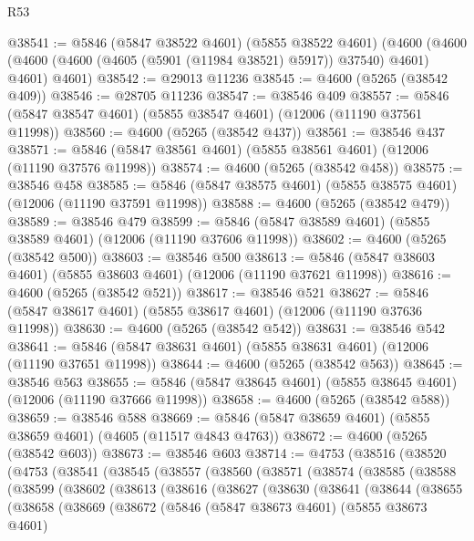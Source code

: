 \begin{lexlean}{R53}
\begin{coremodule}
@38541 := @5846
    (@5847 @38522 @4601)
    (@5855 @38522 @4601)
    (@4600 (@4600 (@4600 (@4600 (@4605 (@5901 (@11984 @38521) @5917)) @37540) @4601) @4601) @4601)
@38542 := @29013 @11236
@38545 := @4600 (@5265 (@38542 @409))
@38546 := @28705 @11236
@38547 := @38546 @409
@38557 := @5846 (@5847 @38547 @4601) (@5855 @38547 @4601) (@12006 (@11190 @37561 @11998))
@38560 := @4600 (@5265 (@38542 @437))
@38561 := @38546 @437
@38571 := @5846 (@5847 @38561 @4601) (@5855 @38561 @4601) (@12006 (@11190 @37576 @11998))
@38574 := @4600 (@5265 (@38542 @458))
@38575 := @38546 @458
@38585 := @5846 (@5847 @38575 @4601) (@5855 @38575 @4601) (@12006 (@11190 @37591 @11998))
@38588 := @4600 (@5265 (@38542 @479))
@38589 := @38546 @479
@38599 := @5846 (@5847 @38589 @4601) (@5855 @38589 @4601) (@12006 (@11190 @37606 @11998))
@38602 := @4600 (@5265 (@38542 @500))
@38603 := @38546 @500
@38613 := @5846 (@5847 @38603 @4601) (@5855 @38603 @4601) (@12006 (@11190 @37621 @11998))
@38616 := @4600 (@5265 (@38542 @521))
@38617 := @38546 @521
@38627 := @5846 (@5847 @38617 @4601) (@5855 @38617 @4601) (@12006 (@11190 @37636 @11998))
@38630 := @4600 (@5265 (@38542 @542))
@38631 := @38546 @542
@38641 := @5846 (@5847 @38631 @4601) (@5855 @38631 @4601) (@12006 (@11190 @37651 @11998))
@38644 := @4600 (@5265 (@38542 @563))
@38645 := @38546 @563
@38655 := @5846 (@5847 @38645 @4601) (@5855 @38645 @4601) (@12006 (@11190 @37666 @11998))
@38658 := @4600 (@5265 (@38542 @588))
@38659 := @38546 @588
@38669 := @5846 (@5847 @38659 @4601) (@5855 @38659 @4601) (@4605 (@11517 @4843 @4763))
@38672 := @4600 (@5265 (@38542 @603))
@38673 := @38546 @603
@38714 := @4753
    (@38516
      (@38520
        (@4753
          (@38541
            (@38545
              (@38557
                (@38560
                  (@38571
                    (@38574
                      (@38585
                        (@38588
                          (@38599
                            (@38602
                              (@38613
                                (@38616
                                  (@38627
                                    (@38630
                                      (@38641
                                        (@38644
                                          (@38655
                                            (@38658
                                              (@38669
                                                (@38672
                                                  (@5846
                                                    (@5847 @38673 @4601)
                                                    (@5855 @38673 @4601)

\end{coremodule}
\end{lexlean}
